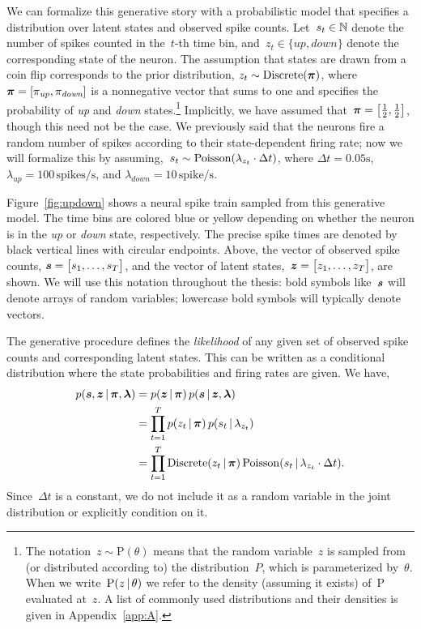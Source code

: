 \sloppy We can formalize this generative story with a probabilistic
model that specifies a distribution over latent states and observed
spike counts. Let~$s_t \in \mathbb{N}$ denote the number of spikes
counted in the~$t$-th time bin, and~$z_t \in \{\textit{up},
\textit{down}\}$ denote the corresponding state of the neuron. The
assumption that states are drawn from a coin flip corresponds to the
prior distribution, ${z_t \sim \mathrm{Discrete}(\boldsymbol{\pi})}$, where~${\boldsymbol{\pi} =
  [\pi_{\textit{up}}, \pi_{\textit{down}}]}$ is a nonnegative vector
that sums to one and specifies the probability of \textit{up} and
\textit{down} states.\footnote{The notation~${z \sim
    \mathrm{P}(\theta)}$ means that the random variable~$z$ is sampled
  from (or distributed according to) the distribution~$P$, which is
  parameterized by~$\theta$. When we write~${\mathrm{P}(z \,|\,
    \theta)}$ we refer to the density (assuming it exists)
  of~$\mathrm{P}$ evaluated at~$z$.  A list of commonly used
  distributions and their densities is given in Appendix~\ref{app:A}.}
Implicitly, we have assumed that~${\boldsymbol{\pi}=\big[\tfrac{1}{2},
    \tfrac{1}{2} \big]}$, though this need not be the case.  We
previously said that the neurons fire a random number of spikes
according to their state-dependent firing rate; now we will formalize
this by assuming,~${s_{t} \sim \mathrm{Poisson}(\lambda_{z_t} \cdot \Delta
  t)}$, where ${\Delta t = 0.05\text{s}}$, ${\lambda_{\textit{up}} =
  100\,\text{spikes/s}}$, and ${\lambda_{\textit{down}} =
  10\,\text{spike/s}}$.

Figure~\ref{fig:updown} shows a neural spike train sampled from this
generative model. The time bins are colored blue or yellow depending
on whether the neuron is in the \textit{up} or \textit{down} state,
respectively.  The precise spike times are denoted by black vertical
lines with circular endpoints. Above, the vector of observed spike
counts, ${\boldsymbol{s} = \big[s_1, \ldots, s_T \big]}$, and the vector of
latent states,~${\boldsymbol{z} = \big[z_1, \ldots, z_T \big]}$, are shown.  We
will use this notation throughout the thesis: bold symbols like~$\boldsymbol{s}$
will denote arrays of random variables; lowercase bold symbols will
typically denote vectors.

The generative procedure defines the \emph{likelihood} of any given
set of observed spike counts and corresponding latent states. This can
be written as a conditional distribution where the state probabilities
and firing rates are given. We have,
\begin{align}
  \label{eq:lkhd_chain_rule}
  p(\boldsymbol{s}, \boldsymbol{z} \,|\, \boldsymbol{\pi}, \boldsymbol{\lambda}) 
  &= p(\boldsymbol{z} \,|\, \boldsymbol{\pi}) \, p(\boldsymbol{s} \,|\, \boldsymbol{z}, \boldsymbol{\lambda}) \\
  \label{eq:lkhd_factorized}
  &= \prod_{t=1}^T p(z_t \,|\, \boldsymbol{\pi}) \, p(s_t \,|\, \lambda_{z_t}) \\
  \label{eq:lkhd_factorized_forms}
  &= \prod_{t=1}^T \mathrm{Discrete}(z_t \,|\, \boldsymbol{\pi}) \, \mathrm{Poisson}(s_t \,|\, \lambda_{z_t} \cdot \Delta t).
\end{align}
Since~$\Delta t$ is a constant, we do not include it as a random
variable in the joint distribution or explicitly condition on it.

